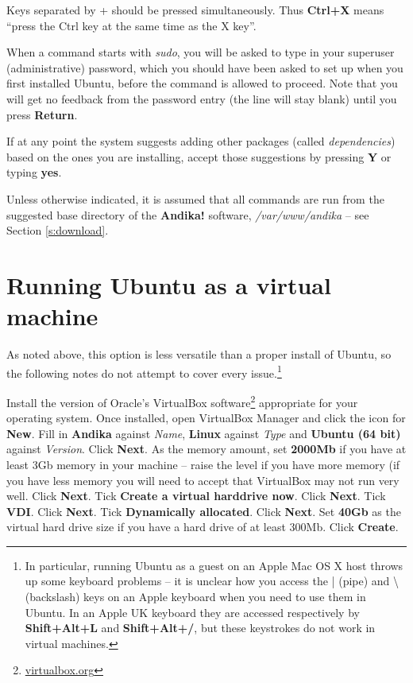 Keys separated by + should be pressed simultaneously.  Thus \textbf{Ctrl+X} means ``press the Ctrl key at the same time as the X key''.

When a command starts with \textit{sudo}, you will be asked to type in your superuser (administrative) password, which you should have been asked to set up when you first installed Ubuntu, before the command is allowed to proceed.  Note that you will get no feedback from the password entry (the line will stay blank) until you press \textbf{Return}.

If at any point the system suggests adding other packages (called \textit{dependencies}) based on the ones you are installing, accept those suggestions by pressing \textbf{Y} or typing \textbf{yes}.

Unless otherwise indicated, it is assumed that all commands are run from the suggested base directory of the \textbf{Andika!} software, \textit{/var/www/andika} -- see Section \ref{s:download}.


\section{Running Ubuntu as a virtual machine}
\label{s:ubuntuvm}

As noted above, this option is less versatile than a proper install of Ubuntu, so the following notes do not attempt to cover every issue.\footnote{In particular, running Ubuntu as a guest on an Apple Mac OS X host throws up some keyboard problems -- it is unclear how you access the | (pipe) and \textbackslash (backslash) keys on an Apple keyboard when you need to use them in Ubuntu.  In an Apple UK keyboard they are accessed respectively by \textbf{Shift+Alt+L} and \textbf{Shift+Alt+/}, but these keystrokes do not work in virtual machines.}


Install the version of Oracle's VirtualBox software\footnote{\url{virtualbox.org}} appropriate for your operating system.  Once installed, open VirtualBox Manager and click the icon for \textbf{New}.  Fill in \textbf{Andika} against \textit{Name}, \textbf{Linux} against \textit{Type} and \textbf{Ubuntu (64 bit)} against \textit{Version}. Click \textbf{Next}.  As the memory amount, set \textbf{2000Mb} if you have at least 3Gb memory in your machine -- raise the level if you have more memory (if you have less memory you will need to accept that VirtualBox may not run very well.  Click \textbf{Next}.  Tick \textbf{Create a virtual harddrive now}.  Click \textbf{Next}.  Tick \textbf{VDI}.  Click \textbf{Next}.  Tick \textbf{Dynamically allocated}.  Click \textbf{Next}.  Set \textbf{40Gb} as the virtual hard drive size if you have a hard drive of at least 300Mb.  Click \textbf{Create}.

